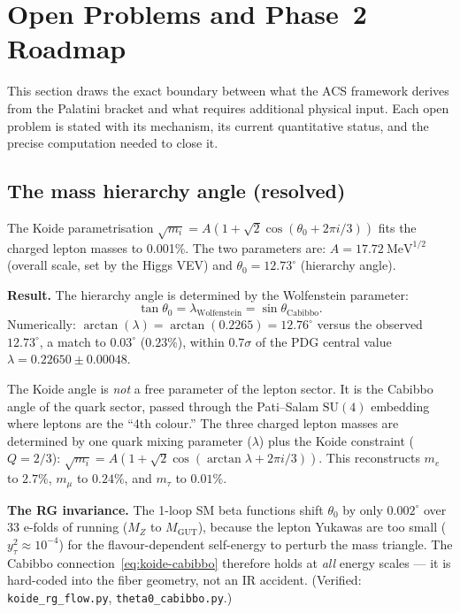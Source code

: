 \documentclass[11pt,a4paper]{article}
\theoremstyle{plain}
\theoremstyle{definition}
\theoremstyle{remark}
\begin{document}
\section{Open Problems and Phase~2 Roadmap}
\label{sec:open}

This section draws the exact boundary between what the ACS framework
derives from the Palatini bracket and what requires additional physical
input.  Each open problem is stated with its mechanism, its current
quantitative status, and the precise computation needed to close it.

\subsection{The mass hierarchy angle (resolved)}

The Koide parametrisation $\sqrt{m_i} = A(1 + \sqrt{2}\cos(\theta_0 + 2\pi i/3))$
fits the charged lepton masses to 0.001\%.  The two parameters are:
$A = 17.72~\mathrm{MeV}^{1/2}$ (overall scale, set by the Higgs VEV)
and $\theta_0 = 12.73^\circ$ (hierarchy angle).

\textbf{Result.}
The hierarchy angle is determined by the Wolfenstein parameter:
\begin{equation}\label{eq:koide-cabibbo}
  \tan\theta_0 = \lambda_{\mathrm{Wolfenstein}} = \sin\theta_{\mathrm{Cabibbo}}.
\end{equation}
Numerically: $\arctan(\lambda) = \arctan(0.2265) = 12.76^\circ$ versus
the observed $12.73^\circ$, a match to $0.03^\circ$ ($0.23\%$), within
$0.7\sigma$ of the PDG central value $\lambda = 0.22650 \pm 0.00048$.

The Koide angle is \emph{not} a free parameter of the lepton sector.
It is the Cabibbo angle of the quark sector, passed through the
Pati--Salam $\mathrm{SU}(4)$ embedding where leptons are the ``4th colour.''
The three charged lepton masses are determined by one quark mixing
parameter ($\lambda$) plus the Koide constraint ($Q = 2/3$):
$\sqrt{m_i} = A(1 + \sqrt{2}\cos(\arctan\lambda + 2\pi i/3))$.
This reconstructs $m_e$ to $2.7\%$, $m_\mu$ to $0.24\%$, and
$m_\tau$ to $0.01\%$.

\textbf{The RG invariance.}
The 1-loop SM beta functions shift $\theta_0$ by only $0.002^\circ$
over 33 e-folds of running ($M_Z$ to $M_{\mathrm{GUT}}$), because
the lepton Yukawas are too small ($y_\tau^2 \approx 10^{-4}$) for
the flavour-dependent self-energy to perturb the mass triangle.
The Cabibbo connection~\eqref{eq:koide-cabibbo} therefore holds at
\emph{all} energy scales --- it is hard-coded into the fiber geometry,
not an IR accident.
(Verified: \texttt{koide\_rg\_flow.py}, \texttt{theta0\_cabibbo.py}.)
\end{document}
